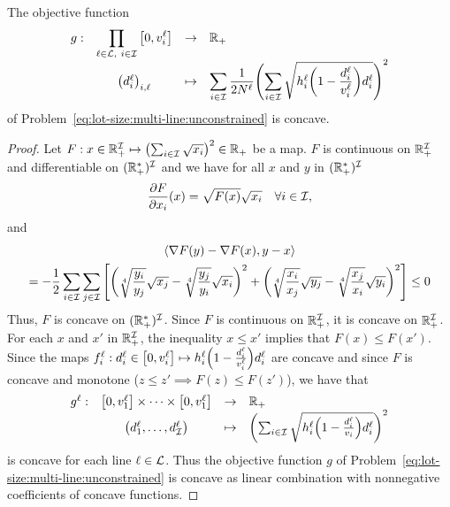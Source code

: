 \begin{prop}\label{lem:concave-objective-function}
The objective function
\begin{equation}
\begin{array}{rccl}
  g: & \ds\prod_{\ell\in\lines,\ i\in\REF} \sqbracket{0,\rate_i^{\ell}} & \to & \RR_+ \\
     & \bracket{\demand_i^{\ell}}_{i,\ell} & \mapsto & \ds\sum_{i\in\REF} \frac{1}{2\nbsetups^{\ell}}\bracket{\sum_{i\in\REF}\sqrt{\holding_i^{\ell}\bracket{1-\frac{\demand_i^{\ell}}{\rate_i^{\ell}}}\demand_i^{\ell}}}^2
\end{array}
\end{equation}
of Problem~\eqref{eq:lot-size:multi-line:unconstrained} is concave.
\end{prop}


\begin{proof}
Let $F: x\in\RR_+^{\REF} \mapsto \bracket{\sum_{i\in\REF} \sqrt{x_i}}^2 \in \RR_+$ be a map.
$F$ is continuous on $\mathbb{R}_+^{\mathcal{I}}$ and differentiable on $(\mathbb{R}_+^*)^{\mathcal{I}}$ and we have for all $x$ and $y$ in $(\mathbb{R}_+^*)^{\mathcal{I}}$
\begin{equation}
  \frac{\partial F}{\partial x_i}\bracket{x} = \sqrt{F(x)}\sqrt{x_i} \quad\forall i\in\REF,
\end{equation}
and
\begin{multline}
\left<\nabla F(y)-\nabla F(x),y-x\right>
\\
=
-\frac{1}{2}\sum_{i\in\REF}\sum_{j\in\REF}
\sqbracket
{
  \bracket{ \sqrt[4]{\frac{y_i}{y_j}}\sqrt{x_j} - \sqrt[4]{\frac{y_j}{y_i}}\sqrt{x_i} }^2
  +
  \bracket{ \sqrt[4]{\frac{x_i}{x_j}}\sqrt{y_j} - \sqrt[4]{\frac{x_j}{x_i}}\sqrt{y_i} }^2
}
\le 0
\end{multline}
Thus, $F$ is concave on $(\mathbb{R}_+^*)^{\mathcal{I}}$.
Since $F$ is continuous on $\mathbb{R}_+^{\mathcal{I}}$, it is concave on $\mathbb{R}_+^{\mathcal{I}}$.
For each $x$ and $x'$ in $\mathbb{R}_+^{\mathcal{I}}$, the inequality $x\le x'$ implies that $F(x)\le F(x')$.
Since the maps $f_i^{\ell}:\demand_i^{\ell}\in\sqbracket{0,\rate_i^{\ell}}\mapsto\holding_i^{\ell}\bracket{1-\frac{\demand_i^{\ell}}{\rate_i^{\ell}}}\demand_i^{\ell}$ are concave and since $F$ is concave and monotone (\ie $z\le z'\implies F(z)\le F(z')$), we have that
\begin{equation}
\begin{array}{rccl}
  g^{\ell}: & \sqbracket{0,\rate_1^{\ell}}\times\cdots\times\sqbracket{0,\rate_1^{\ell}} & \to     & \RR_+ \\
            & \bracket{\demand_1^{\ell},\ldots,\demand_{\REF}^{\ell}} & \mapsto & \bracket{\sum_{i\in\REF}\sqrt{\holding_i^{\ell}\bracket{1-\frac{\demand_i^{\ell}}{\rate_i}}\demand_i^{\ell}}}^2
\end{array}
\end{equation}
is concave for each line $\ell\in\mathcal{L}$.
Thus the objective function $g$ of Problem~\eqref{eq:lot-size:multi-line:unconstrained} is concave as linear combination with nonnegative coefficients of concave functions.
\end{proof}


